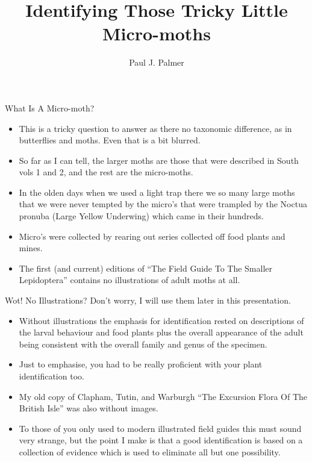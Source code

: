\documentclass[
  ignorenonframetext,
]{beamer}
\title{Identifying Those Tricky Little Micro-moths}
\author{Paul J. Palmer}
\date{}
\providecommand{\tightlist}{%
  \setlength{\itemsep}{0pt}\setlength{\parskip}{0pt}}
\begin{document}
\frame{\titlepage}

\begin{frame}{What Is A Micro-moth?}
\protect\hypertarget{what-is-a-micro-moth}{}
\begin{itemize}
\tightlist
\item
  This is a tricky question to answer as there no taxonomic difference,
  as in butterflies and moths. Even that is a bit blurred.
\item
  So far as I can tell, the larger moths are those that were described
  in South vols 1 and 2, and the rest are the micro-moths.
\item
  In the olden days when we used a light trap there we so many large
  moths that we were never tempted by the micro's that were trampled by
  the Noctua pronuba (Large Yellow Underwing) which came in their
  hundreds.
\item
  Micro's were collected by rearing out series collected off food plants
  and mines.
\item
  The first (and current) editions of ``The Field Guide To The Smaller
  Lepidoptera'' contains no illustrations of adult moths at all.
\end{itemize}
\end{frame}

\begin{frame}{Wot! No Illustrations?}
\protect\hypertarget{wot-no-illustrations}{}
Don't worry, I will use them later in this presentation.

\begin{itemize}
\tightlist
\item
  Without illustrations the emphasis for identification rested on
  descriptions of the larval behaviour and food plants plus the overall
  appearance of the adult being consistent with the overall family and
  genus of the specimen.
\item
  Just to emphasise, you had to be really proficient with your plant
  identification too.
\item
  My old copy of Clapham, Tutin, and Warburgh ``The Excursion Flora Of
  The British Isle'' was also without images.
\item
  To those of you only used to modern illustrated field guides this must
  sound very strange, but the point I make is that a good identification
  is based on a collection of evidence which is used to eliminate all
  but one possibility.
\end{itemize}
\end{frame}
\end{document}

